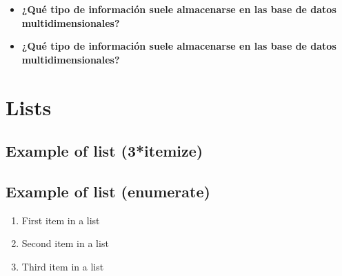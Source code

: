 \documentclass[paper=a4, fontsize=11pt]{scrartcl} %
\begin{document}
\begin{itemize}
\item \textbf{ ¿Qué tipo de información suele almacenarse en las base de datos multidimensionales?}
\end{itemize}

\begin{itemize}
\item \textbf{ ¿Qué tipo de información suele almacenarse en las base de datos multidimensionales?}
\end{itemize}




\section{Lists}


\subsection{Example of list (3*itemize)}


\subsection{Example of list (enumerate)}
\begin{enumerate}
\item First item in a list 
\item Second item in a list 
\item Third item in a list
\end{enumerate}

\end{document}
